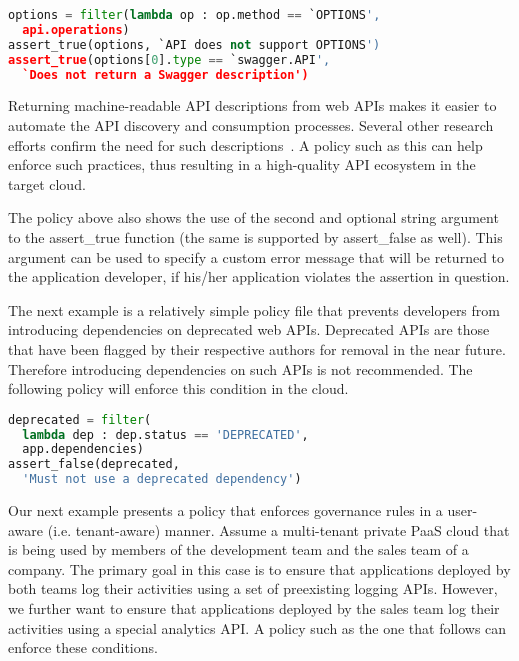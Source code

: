 \vspace{0.05in}
{\footnotesize
\begin{lstlisting}[language=Python, frame=single, showstringspaces=false]
options = filter(lambda op : op.method == `OPTIONS',  
  api.operations)
assert_true(options, `API does not support OPTIONS')
assert_true(options[0].type == `swagger.API', 
  `Does not return a Swagger description')
\end{lstlisting}
}
\vspace{0.05in}

Returning machine-readable API descriptions from web APIs 
makes it easier to automate the API discovery and consumption processes. Several other
research efforts confirm the need for such descriptions~\cite{Verborgh:2012:FDB:2307819.2307828,Steiner:2011:FHC:1967428.1967433}. 
A policy such as this
can help enforce such practices, thus resulting in a high-quality
API ecosystem in the target cloud. 

The policy above also shows the use of the second and
optional string argument to 
the assert\_true function (the same is supported by assert\_false as well). 
This argument can be used to specify
a custom error message that will be returned to the application developer, if his/her application
violates the assertion in question.

The next example is a relatively simple policy file 
that prevents developers from introducing
dependencies on deprecated web APIs. Deprecated APIs 
are those that have been flagged
by their respective authors for removal 
in the near future. Therefore introducing dependencies on such
APIs is not recommended. The following policy will 
enforce this condition in the cloud.

\vspace{0.05in}
{\footnotesize
\begin{lstlisting}[language=Python, frame=single, showstringspaces=false]
deprecated = filter(
  lambda dep : dep.status == 'DEPRECATED', 
  app.dependencies)
assert_false(deprecated, 
  'Must not use a deprecated dependency')
\end{lstlisting}
}
\vspace{0.05in}

Our next example presents a policy that enforces governance 
rules in a user-aware (i.e. tenant-aware) manner. Assume
a multi-tenant private PaaS cloud that is being 
used by members of the development
team and the sales team of a company. The primary goal in this case
is to ensure that applications deployed by both teams
log their activities using a set of preexisting logging APIs. 
However, we further want to ensure that applications
deployed by the sales team log their activities using 
a special analytics API. A policy such as the one
that follows can enforce these conditions.

